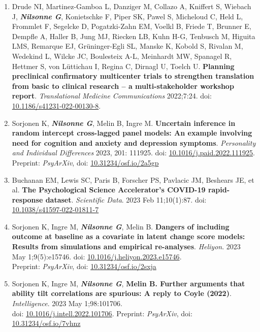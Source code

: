 \documentclass[10pt]{article}
\begin{document}
\begin{enumerate}[nolistsep]
\item Drude NI, Martinez-Gamboa L, Danziger M, Collazo A, Kniffert S, Wiebach J, \textbf{\textit{Nilsonne G}}, Konietschke F, Piper SK, Pawel S, Micheloud C, Held L, Frommlet F, Segelcke D, Pogatzki-Zahn EM, Voelkl B, Friede T, Brunner E, Dempfle A, Haller B, Jung MJ, Riecken LB, Kuhn H-G, Tenbusch M, Higuita LMS, Remarque EJ, Grüninger-Egli SL, Manske K, Kobold S, Rivalan M, Wedekind L, Wilcke JC, Boulesteix A-L, Meinhardt MW, Spanagel R, Hettmer S, von Lüttichau I, Regina C, Dirnagl U, Toelch U. \textbf{Planning preclinical confirmatory multicenter trials to strengthen translation from basic to clinical research – a multi-stakeholder workshop report}. \emph{Translational Medicine Communications} 2022;7:24. doi: \href{https://doi.org/10.1186/s41231-022-00130-8}{10.1186/s41231-022-00130-8}.
\item Sorjonen K, \textbf{\textit{Nilsonne G}}, Melin B, Ingre M. \textbf{Uncertain inference in random intercept cross-lagged panel models: An example involving need for cognition and anxiety and depression symptoms}. \emph{Personality and Individual Differences} 2023, 201: 111925. doi: \href{https://doi.org/10.1016/j.paid.2022.111925}{10.1016/j.paid.2022.111925}. Preprint: \emph{PsyArXiv}, doi: \href{https://doi.org/10.31234/osf.io/2a5gp}{10.31234/osf.io/2a5gp}
\item Buchanan EM, Lewis SC, Paris B, Forscher PS, Pavlacic JM, Beshears JE, et al. \textbf{The Psychological Science Accelerator’s COVID-19 rapid-response dataset}. \emph{Scientific Data}. 2023 Feb 11;10(1):87. doi: \href{https://doi.org/10.1038/s41597-022-01811-7}{10.1038/s41597-022-01811-7}
\item Sorjonen K, Ingre M, \textbf{\textit{Nilsonne G}}, Melin B. \textbf{Dangers of including outcome at baseline as a covariate in latent change score models: Results from simulations and empirical re-analyses}. \emph{Heliyon}. 2023 May 1;9(5):e15746. doi: \href{https://doi.org/10.1016/j.heliyon.2023.e15746}{10.1016/j.heliyon.2023.e15746}. \\Preprint: \emph{PsyArXiv}, doi: \href{https://doi.org/10.31234/osf.io/2sxja}{10.31234/osf.io/2sxja}
\item Sorjonen K, Ingre M, \textbf{\textit{Nilsonne G}}, \textbf{Melin B. Further arguments that ability tilt correlations are spurious: A reply to Coyle (2022)}. \emph{Intelligence}. 2023 May 1;98:101706. \\
doi: \href{https://doi.org/10.1016/j.intell.2022.101706}{10.1016/j.intell.2022.101706}. Preprint: \emph{PsyArXiv}, doi: \href{https://doi.org/10.31234/osf.io/7vhnz}{10.31234/osf.io/7vhnz}

\end{enumerate}
\end{document}
